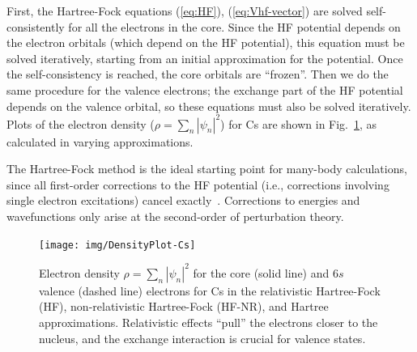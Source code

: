 \documentclass[10pt,twocolumn,a4paper]{article}%
\newcommand{\braket}[1]{\ensuremath{\langle #1\rangle}}	%
\newcommand{\E}[1]{\ensuremath{\times10^{#1}}}	%
\begin{document}
First, the Hartree-Fock equations (\ref{eq:HF}), (\ref{eq:Vhf-vector}) are solved self-consistently for all the electrons in the core.
Since the HF potential depends on the electron orbitals (which depend on the HF potential), this equation must be solved iteratively, starting from an initial approximation for the potential.
Once the self-consistency is reached, the core orbitals are ``frozen''.
Then we do the same procedure for the valence electrons; the exchange part of the HF potential depends on the valence orbital, so these equations must also be solved iteratively.
Plots of the electron density ($\rho = \sum_n|\psi_n|^2$) for Cs are shown in Fig.~\ref{fig:ElectronDensity}, as calculated in varying approximations.



The Hartree-Fock method is the ideal starting point for many-body calculations, since all first-order corrections to the HF potential (i.e., corrections involving single electron excitations) cancel exactly~\cite{Lindgren1986}.
Corrections to energies and wavefunctions only arise at the second-order of perturbation theory.







\begin{figure}
\centering
\texttt{[image: img/DensityPlot-Cs]}
\caption{\small Electron density $\rho = \sum_n|\psi_n|^2$ for the core (solid line) and $6s$ valence (dashed line) electrons for Cs in the relativistic Hartree-Fock (HF), non-relativistic Hartree-Fock (HF-NR), and Hartree approximations. Relativistic effects ``pull'' the electrons closer to the nucleus, and the exchange interaction is crucial for valence states.\label{fig:ElectronDensity}}
\end{figure}
\end{document}
